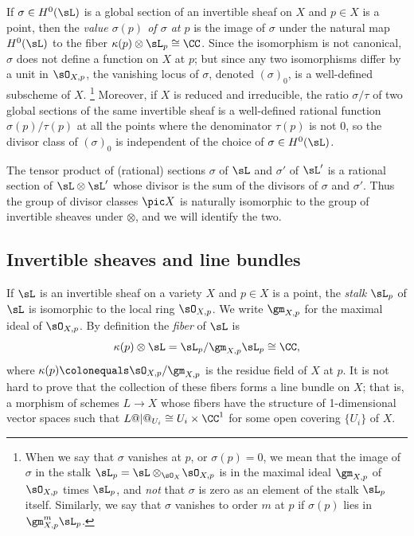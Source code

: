 If $\sigma\in H^0(\sL)$ is a global section of an invertible sheaf on
%
$X$ and $p\in X$ is a point, then the
\emph{value $\sigma(p)$ of $\sigma$ at $p$}
is the image  of $\sigma$ under the natural map
$H^0(\sL)$ to the fiber $\kappa(p) \otimes \sL_{p} \cong \CC$.
Since the isomorphism is not canonical, $\sigma$ does not define a function on $X$ at $p$; but since any two isomorphisms
differ by a unit in $\sO_{X,p}$, the vanishing locus of $\sigma$,
denoted $(\sigma)_0$, is a well-defined subscheme of $X$.%
%
\footnote{
When we  say that
$\sigma$ vanishes at $p$,
or $\sigma(p) = 0$, we mean that the
image of $\sigma$ in the stalk $\sL_p = \sL \otimes_{\sO_{X}}\!\sO_{X,p}$ is in
the maximal ideal $\gm_{X,p}$ of $\sO_{X,p}$ times $\sL_p$,
and \emph{not} that $\sigma$ is zero
as an element of the stalk $\sL_p$ itself. Similarly, we say that $\sigma$ vanishes to order $m$ at $p$ if $\sigma(p)$ lies in $\gm_{X,p}^m\sL_p$. }
%
 Moreover, if $X$ is reduced and irreducible,
the ratio $\sigma/\tau$ of two global sections
 of the same invertible sheaf is a well-defined rational function
$\sigma(p)/\tau(p)$ at all the points where the denominator $\tau(p)$ is not 0, so the divisor class of
$(\sigma)_0$ is independent of the choice of $\sigma \in H^0(\sL)$.

The tensor product of (rational) sections $\sigma$ of $\sL$ and $\sigma'$
of $\sL'$ is a rational section of $\sL \otimes \sL'$
whose divisor is
the sum of the divisors of $\sigma$ and
$\sigma'$. Thus the group of divisor classes $\pic X$ is naturally isomorphic to the group of invertible
sheaves under $\otimes$, and we will identify the two.

\subsection*{Invertible sheaves and line bundles}

If $\sL$ is an invertible sheaf on a variety $X$ and $p\in X$ is a point, the
%
%
%
\emph{stalk} $\sL_p$
of $\sL$ is isomorphic to the local
ring $\sO_{X,p}$. We write
$\gm_{X,p}$
for the maximal ideal of $\sO_{X,p}$. By definition the
\emph{fiber}
%
of $\sL$ is
$$
\kappa(p) \otimes \sL =\sL_p/\gm_{X,p}\sL_p\cong \CC
,
$$
where
%
$\kappa(p) \colonequals \sO_{X,p}/\gm_{X,p}$
is the residue field of $X$ at $p$.
It is not hard to prove that the collection of these fibers forms a line bundle on $X$; that is,
%
a morphism of schemes $L \to X$ whose fibers have the structure of 1-dimensional vector spaces
such that $L@|@_{U_{i}} \cong U_{i}\times \CC^{1}$ for some open covering $\{U_{i}\}$ of $X$.

